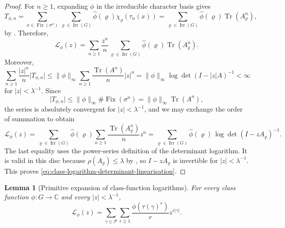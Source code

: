 \documentclass[11pt,a4paper]{amsart}
\theoremstyle{plain}
\newtheorem{lemma}[theorem]{Lemma}
\theoremstyle{definition}
\theoremstyle{remark}
\DeclareMathOperator{\Tr}{Tr}
\DeclareMathOperator{\Irr}{Irr}
\newcommand{\CC}{\mathbb{C}}
\newcommand{\cP}{\mathcal P}
\newcommand{\abs}[1]{\lvert #1 \rvert}
\newcommand{\norm}[1]{\lVert #1 \rVert}
\begin{document}
\begin{proof}
  For \(n\ge 1\), expanding \(\phi\) in the irreducible character basis
  gives
  \[
    T_{\phi,n}
    =\sum_{x\in\operatorname{Fix}(\sigma^n)}
      \sum_{\varrho\in\Irr(G)}
        \widehat\phi(\varrho)\chi_\varrho(\tau_n(x))
    =\sum_{\varrho\in\Irr(G)}
      \widehat\phi(\varrho)\Tr(A_\varrho^n),
  \]
  by . Therefore,
  \[
    \mathcal L_\phi(z)
    =\sum_{n\ge 1}\frac{z^n}{n}
      \sum_{\varrho\in\Irr(G)}
        \widehat\phi(\varrho)\Tr(A_\varrho^n).
  \]
  Moreover,
  \[
    \sum_{n\ge 1}\frac{|z|^n}{n}\abs{T_{\phi,n}}
    \le
    \norm{\phi}_\infty
    \sum_{n\ge 1}\frac{\Tr(A^n)}{n}|z|^n
    =
    \norm{\phi}_\infty \log\det(I-|z|A)^{-1}
    <\infty
  \]
  for \(|z|<\lambda^{-1}\). Since
  \[
    \abs{T_{\phi,n}}
    \le \norm{\phi}_\infty \#\operatorname{Fix}(\sigma^n)
    =\norm{\phi}_\infty \Tr(A^n),
  \]
  the series is absolutely convergent for \(|z|<\lambda^{-1}\), and we
  may exchange the order of summation to obtain
  \[
    \mathcal L_\phi(z)
    =
    \sum_{\varrho\in\Irr(G)}
      \widehat\phi(\varrho)
      \sum_{n\ge 1}\frac{\Tr(A_\varrho^n)}{n}z^n
    =
    \sum_{\varrho\in\Irr(G)}
      \widehat\phi(\varrho)\,
      \log\det(I-zA_\varrho)^{-1}.
  \]
  The last equality uses the power-series definition of the determinant
  logarithm. It is valid in this disc because
  \(\rho(A_\varrho)\le \lambda\) by
  , so
  \(I-zA_\varrho\) is invertible for \(|z|<\lambda^{-1}\).
  This proves \eqref{eq:class-logarithm-determinant-linearisation}.
\end{proof}

\begin{lemma}[Primitive expansion of class-function logarithms]
  \label{lem:class-logarithm-primitive-expansion}
  For every class function \(\phi:G\to\CC\) and every
  \(|z|<\lambda^{-1}\),
  \begin{equation}\label{eq:class-logarithm-primitive-expansion}
    \mathcal L_\phi(z)
    =
    \sum_{\gamma\in\cP}\sum_{r\ge 1}
      \frac{\phi(\tau(\gamma)^r)}{r}z^{r|\gamma|}.
  \end{equation}
\end{lemma}
\end{document}
